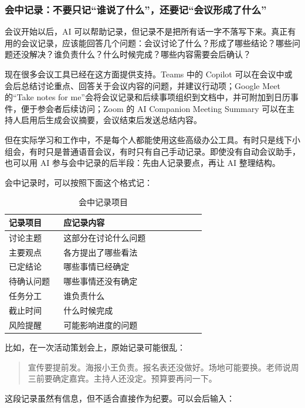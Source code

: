 \subsubsection*{会中记录：不要只记“谁说了什么”，还要记“会议形成了什么”}

会议开始以后，AI 可以帮助记录，但记录不是把所有话一字不落写下来。真正有用的会议记录，应该能回答几个问题：会议讨论了什么？形成了哪些结论？哪些问题还没解决？谁负责什么？什么时候完成？哪些内容需要会后确认？

现在很多会议工具已经在这方面提供支持。Teams 中的 Copilot 可以在会议中或会后总结讨论重点、回答关于会议内容的问题，并建议行动项；Google Meet 的“Take notes for me”会将会议记录和后续事项组织到文档中，并可附加到日历事件，便于参会者后续访问；Zoom 的 AI Companion Meeting Summary 可以在主持人启用后生成会议摘要，会议结束后发送总结内容。

但在实际学习和工作中，不是每个人都能使用这些高级办公工具。有时只是线下小组会，有时只是普通语音会议，有时只有自己手动记录。即使没有自动会议助手，也可以用 AI 参与会中记录的后半段：先由人记录要点，再让 AI 整理结构。

会中记录时，可以按照下面这个格式记：

\begin{table}[H]
\centering
\caption{会中记录项目}
\label{tab:meeting-record-items}
\begin{tabular}{p{0.25\linewidth} p{0.65\linewidth}}
\toprule
\textbf{记录项目} & \textbf{应记录内容} \\
\midrule
讨论主题 & 这部分在讨论什么问题 \\
主要观点 & 各方提出了哪些看法 \\
已定结论 & 哪些事情已经确定 \\
待确认问题 & 哪些事情还没有确定 \\
任务分工 & 谁负责什么 \\
截止时间 & 什么时候完成 \\
风险提醒 & 可能影响进度的问题 \\
\bottomrule
\end{tabular}
\end{table}

比如，在一次活动策划会上，原始记录可能很乱：
\begin{quote}
宣传要提前发。海报小王负责。报名表还没做好。场地可能要换。老师说周三前要确定嘉宾。主持人还没定。预算要再问一下。
\end{quote}

这段记录虽然有信息，但不适合直接作为纪要。可以会后输入：

